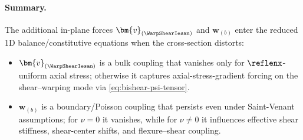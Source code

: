 \paragraph{Summary.}
The additional in-plane forces $\bm{v}_{(\WarpShearIesan)}$ and $\bm{w}_{(b)}$ enter the reduced 1D balance/constitutive equations when the cross-section distorts:
\begin{itemize}
  \item $\bm{v}_{(\WarpShearIesan)}$ is a bulk coupling that vanishes only for $\reflenx$-uniform axial stress; otherwise it captures axial-stress-gradient forcing on the shear–warping mode via \eqref{eq:bishear-psi-tensor}.
  \item $\bm{w}_{(b)}$ is a boundary/Poisson coupling that persists even under Saint-Venant assumptions; for $\nu=0$ it vanishes, while for $\nu\neq 0$ it influences effective shear stiffness, shear-center shifts, and flexure–shear coupling.
\end{itemize}


% 
